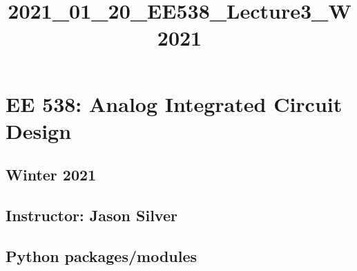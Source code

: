 \documentclass[11pt]{article}
\title{2021\_01\_20\_EE538\_Lecture3\_W2021}
\begin{document}
    
    \maketitle
    
    

    
    \hypertarget{ee-538-analog-integrated-circuit-design}{%
\section{EE 538: Analog Integrated Circuit
Design}\label{ee-538-analog-integrated-circuit-design}}

\hypertarget{winter-2021}{%
\subsection{Winter 2021}\label{winter-2021}}

\hypertarget{instructor-jason-silver}{%
\subsection{Instructor: Jason Silver}\label{instructor-jason-silver}}

    \hypertarget{python-packagesmodules}{%
\subsection{Python packages/modules}\label{python-packagesmodules}}
\end{document}
